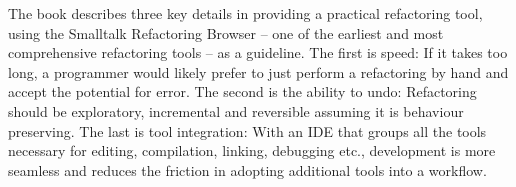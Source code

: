 The book describes three key details in providing a practical refactoring tool, using the Smalltalk Refactoring Browser -- one of the earliest and most comprehensive refactoring tools -- as a guideline. The first is speed: If it takes too long, a programmer would likely prefer to just perform a refactoring by hand and accept the potential for error. The second is the ability to undo: Refactoring should be exploratory, incremental and reversible assuming it is behaviour preserving. The last is tool integration: With an IDE that groups all the tools necessary for editing, compilation, linking, debugging etc., development is more seamless and reduces the friction in adopting additional tools into a workflow. 


